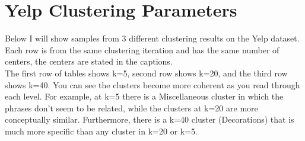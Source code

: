 \documentclass{article}
\begin{document}
\section*{Yelp Clustering Parameters}
Below I will show samples from 3 different clustering results on the Yelp dataset.  Each row is from the same clustering iteration and has the same number of centers, the centers are stated in the captions.\\
The first row of tables shows k=5, second row shows k=20, and the third row shows k=40.  You can see the clusters become more coherent as you read through each level.  For example, at k=5 there is a Miscellaneous cluster in which the phrases don't seem to be related,  while the clusters at k=20 are more conceptually similar. Furthermore, there is a k=40 cluster (Decorations) that is much more specific than any cluster in k=20 or k=5.
\end{document}
